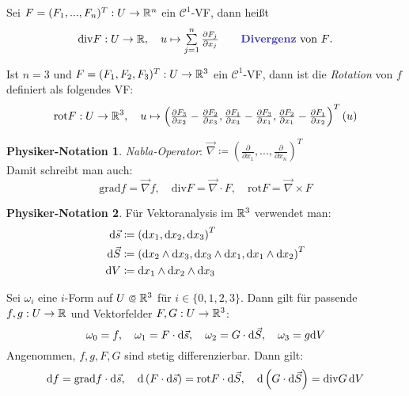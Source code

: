 \documentclass{cheat-sheet}
\newcommand{\grad}{\mathrm{grad}} %
\newcommand{\divergence}{\mathrm{div}} %
\newcommand{\rot}{\mathrm{rot}} %
\theoremstyle{definition}
\newtheorem*{phnota}{Physiker-Notation}
\begin{document}
\begin{defn}
  Sei $F = (F_1, ..., F_n)^T : U \to \mathbb{R}^n$ ein $\mathcal{C}^1$-VF, dann heißt
  \[
    \divergence F : U \to \R, \quad u \mapsto \sum_{j=1}^n \tfrac{\partial F_j}{\partial x_j}
    \qquad \text{\emph{Divergenz} von $F$.}
  \]
\end{defn}

\begin{defn}
  Ist $n {=} 3$ und $F = (F_1, F_2, F_3)^T : U \to \mathbb{R}^3$ ein $\mathcal{C}^1$-VF, dann ist die \emph{Rotation} von $f$ definiert als folgendes VF:
  \[
    \rot F : U \to \R^3, \quad
    u \mapsto \left(
      \tfrac{\partial F_3}{\partial x_2} - \tfrac{\partial F_2}{\partial x_3},
      \tfrac{\partial F_1}{\partial x_3} - \tfrac{\partial F_3}{\partial x_1},
      \tfrac{\partial F_2}{\partial x_1} - \tfrac{\partial F_1}{\partial x_2}
    \right)^T (u)
  \]
\end{defn}

\begin{phnota}
  \emph{Nabla-Operator}: $\vec{\nabla} \coloneqq \left( \tfrac{\partial}{\partial x_1}, ..., \tfrac{\partial}{\partial x_n} \right)^T$\\
  Damit schreibt man auch:
  \[
    \grad f = \vec{\nabla} f, \quad
    \divergence F = \vec{\nabla} \cdot F, \quad %
    \rot F = \vec{\nabla} \times F %
  \]
\end{phnota}

\begin{phnota}
  Für Vektoranalysis im $\mathbb{R}^3$ verwendet man:
  \begin{align*}
    \mathrm{d} \vec{s} &\coloneqq \left( \mathrm{d} x_1, \mathrm{d} x_2, \mathrm{d} x_3 \right)^T \\
    \mathrm{d} \vec{S} &\coloneqq \left( \mathrm{d} x_2 \wedge \mathrm{d} x_3, \mathrm{d} x_3 \wedge \mathrm{d} x_1, \mathrm{d} x_1 \wedge \mathrm{d} x_2 \right)^T \\
    \mathrm{d} V &\coloneqq \mathrm{d} x_1 \wedge \mathrm{d} x_2 \wedge \mathrm{d} x_3
  \end{align*}
\end{phnota}

\begin{bem}
  Sei $\omega_i$ eine $i$-Form auf $U \opn \R^3$ für $i \in \{ 0, 1, 2, 3 \}$. Dann gilt für passende $f, g : U \to \mathbb{R}$ und Vektorfelder $F, G : U \to \mathbb{R}^3$:
  \[
    \omega_0 = f, \quad
    \omega_1 = F \cdot \mathrm{d} \vec{s}, \quad
    \omega_2 = G \cdot \mathrm{d} \vec{S}, \quad
    \omega_3 = g \mathrm{d} V
  \]
  Angenommen, $f, g, F, G$ sind stetig differenzierbar. Dann gilt:
  \[
    \d f = \grad f \cdot \d \vec{s}, \quad
    \d \left(F \cdot \d \vec{s}\right) = \rot F \cdot \d \vec{S}, \quad
    \d \left(G \cdot \d \vec{S}\right) = \divergence G \, \d V
  \]
\end{bem}
\end{document}
